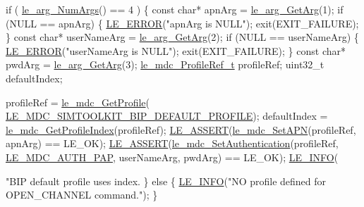 \begin{DoxyCodeInclude}
{{{{{{        \textcolor{keywordflow}{if} ( \hyperlink{le__args_8h_a6fbbeb423104e6eb92fe47ef42b7310a}{le\_arg\_NumArgs}() == 4 )
        \{
            \textcolor{keyword}{const} \textcolor{keywordtype}{char}*         apnArg = \hyperlink{le__args_8h_a5ebca8229facd069785639cb3c1e273a}{le\_arg\_GetArg}(1);
            \textcolor{keywordflow}{if} (NULL == apnArg)
            \{
                \hyperlink{le__log_8h_a353590f91b3143a7ba3a416ae5a50c3d}{LE\_ERROR}(\textcolor{stringliteral}{"apnArg is NULL"});
                exit(EXIT\_FAILURE);
            \}
            \textcolor{keyword}{const} \textcolor{keywordtype}{char}*         userNameArg = \hyperlink{le__args_8h_a5ebca8229facd069785639cb3c1e273a}{le\_arg\_GetArg}(2);
            \textcolor{keywordflow}{if} (NULL == userNameArg)
            \{
                \hyperlink{le__log_8h_a353590f91b3143a7ba3a416ae5a50c3d}{LE\_ERROR}(\textcolor{stringliteral}{"userNameArg is NULL"});
                exit(EXIT\_FAILURE);
            \}
            \textcolor{keyword}{const} \textcolor{keywordtype}{char}*         pwdArg = \hyperlink{le__args_8h_a5ebca8229facd069785639cb3c1e273a}{le\_arg\_GetArg}(3);
            \hyperlink{le__mdc__interface_8h_a91074d8f0d88c6645e3085dfadf87011}{le\_mdc\_ProfileRef\_t} profileRef;
            uint32\_t            defaultIndex;

            profileRef = \hyperlink{le__mdc__interface_8h_a638b693cd5f644fa5c24f81e1e36483c}{le\_mdc\_GetProfile}(
      \hyperlink{le__mdc__interface_8h_ac7b1c4304ae2d46c60fc6d7506313161}{LE\_MDC\_SIMTOOLKIT\_BIP\_DEFAULT\_PROFILE});
            defaultIndex = \hyperlink{le__mdc__interface_8h_a108f7c3db74a377c2ae5482543d4e0d9}{le\_mdc\_GetProfileIndex}(profileRef);
            \hyperlink{le__log_8h_ac0dbbef91dc0fed449d0092ff0557b39}{LE\_ASSERT}(\hyperlink{le__mdc__interface_8h_ae8ebd11b9cb9afb9b6b5745903f50156}{le\_mdc\_SetAPN}(profileRef, apnArg) == LE\_OK);
            \hyperlink{le__log_8h_ac0dbbef91dc0fed449d0092ff0557b39}{LE\_ASSERT}(\hyperlink{le__mdc__interface_8h_a9f69d0751927b5ead6c756202179b222}{le\_mdc\_SetAuthentication}(profileRef,
                                               \hyperlink{le__mdc__interface_8h_ae9758eecfab89fbc1bc01341393a7723a151065be441aa8f065d0ead3d739b6f0}{LE\_MDC\_AUTH\_PAP},
                                               userNameArg,
                                               pwdArg) == LE\_OK);
            \hyperlink{le__log_8h_a23e6d206faa64f612045d688cdde5808}{LE\_INFO}(\textcolor{stringliteral}{"BIP default profile uses index.%
        \}
        \textcolor{keywordflow}{else}
        \{
            \hyperlink{le__log_8h_a23e6d206faa64f612045d688cdde5808}{LE\_INFO}(\textcolor{stringliteral}{"NO profile defined for OPEN\_CHANNEL command."});
        \}

}}}}}}}
\end{DoxyCodeInclude}
